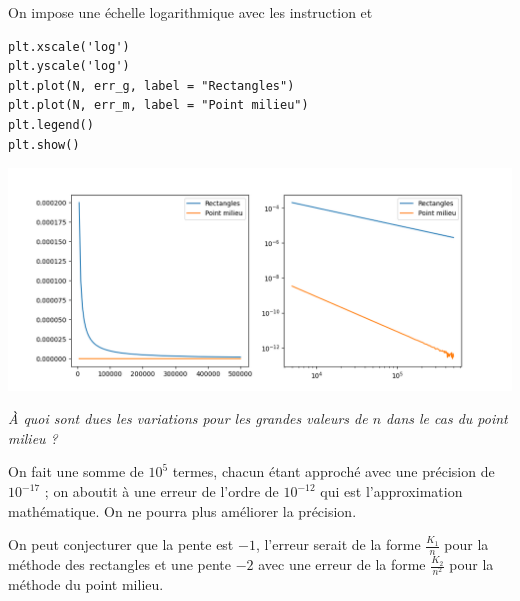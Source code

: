 On impose une échelle logarithmique avec les instruction 
 et 
\begin{lstlisting}
plt.xscale('log')
plt.yscale('log')
plt.plot(N, err_g, label = "Rectangles")
plt.plot(N, err_m, label = "Point milieu")
plt.legend()
plt.show()
\end{lstlisting}
\begin{center}
\includegraphics[scale=0.5]{TP/Images/TP18_err_lin_log.png}
\end{center}
\begin{Exercise}\it
À quoi sont dues les variations pour les grandes valeurs de $n$ dans le cas du point milieu ?
\end{Exercise}
\begin{Answer}

On fait une somme de  $10^5$ termes, chacun étant approché avec une précision de $10^{-17}$ ; on aboutit à une erreur de l'ordre de $10^{-12}$ qui est l'approximation mathématique. On ne pourra plus améliorer la précision.
\end{Answer}
On peut conjecturer que la pente est $-1$, l'erreur serait de la forme $\displaystyle \frac{K_1}{n}$ pour la méthode des rectangles et une pente $-2$ avec une erreur de la forme $\displaystyle \frac{K_2}{n^2}$ pour la méthode du point milieu.

